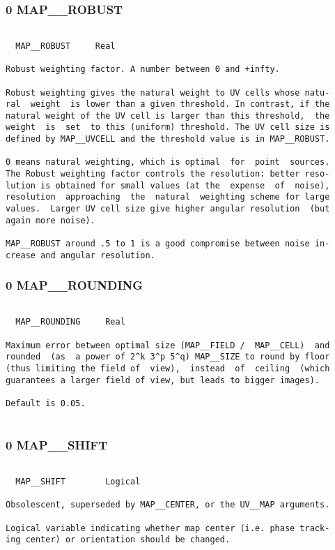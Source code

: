 \subsubsection{0 MAP\_\_ROBUST}
\begin{verbatim}

  MAP__ROBUST     Real

Robust weighting factor. A number between 0 and +infty.

Robust weighting gives the natural weight to UV cells whose natu-
ral  weight  is lower than a given threshold. In contrast, if the
natural weight of the UV cell is larger than this threshold,  the
weight  is  set  to this (uniform) threshold. The UV cell size is
defined by MAP__UVCELL and the threshold value is in MAP__ROBUST.

0 means natural weighting, which is optimal  for  point  sources.
The Robust weighting factor controls the resolution: better reso-
lution is obtained for small values (at the  expense  of  noise),
resolution  approaching  the  natural  weighting scheme for large
values.  Larger UV cell size give higher angular resolution  (but
again more noise).

MAP__ROBUST around .5 to 1 is a good compromise between noise in-
crease and angular resolution.

\end{verbatim}
\subsubsection{0 MAP\_\_ROUNDING}
\begin{verbatim}

  MAP__ROUNDING     Real

Maximum error between optimal size (MAP__FIELD /  MAP__CELL)  and
rounded  (as  a power of 2^k 3^p 5^q) MAP__SIZE to round by floor
(thus limiting the field of  view),  instead  of  ceiling  (which
guarantees a larger field of view, but leads to bigger images).

Default is 0.05.


\end{verbatim}
\subsubsection{0 MAP\_\_SHIFT}
\begin{verbatim}

  MAP__SHIFT        Logical

Obsolescent, superseded by MAP__CENTER, or the UV__MAP arguments.

Logical variable indicating whether map center (i.e. phase track-
ing center) or orientation should be changed.

\end{verbatim}
